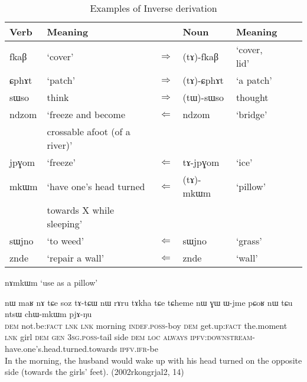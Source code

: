 \documentclass[oldfontcommands,oneside,a4paper,11pt]{article}
\newcommand{\ipa}[1]{{\phon \mbox{#1}}} %
\begin{document}
\begin{table}[H]
\caption{Examples of Inverse derivation} \centering \label{tab:rueckbildung}
\begin{tabular}{lllllll}
\toprule
Verb & Meaning &&Noun & Meaning\\
\midrule
\ipa{fkaβ} & `cover' & $\Rightarrow$ &\ipa{(tɤ)-fkaβ} &`cover, lid' \\
\ipa{ɕphɤt} & `patch'& $\Rightarrow$ &\ipa{(tɤ)-ɕphɤt} & `a patch'  \\
\ipa{sɯso} & think &  $\Rightarrow$ & \ipa{(tɯ)-sɯso} & thought \\
\midrule
\ipa{ndzom} & `freeze and become   &$\Leftarrow$ &\ipa{ndzom} &`bridge' \\
&crossable afoot (of a river)'&&&\\
\ipa{jpɣom} & `freeze' & $\Leftarrow$ &\ipa{tɤ-jpɣom}& `ice' \\
\ipa{mkɯm} & `have one's head turned& $\Leftarrow$ &\ipa{(tɤ)-mkɯm}& `pillow' \\
&   towards X while sleeping' &&&\\
\ipa{sɯjno} & `to weed'   &$\Leftarrow$ &\ipa{sɯjno} &`grass' \\
\ipa{znde} & `repair a wall'  &$\Leftarrow$ &\ipa{znde} &`wall' \\
\bottomrule
\end{tabular}
\end{table}

\ipa{nɤmkɯm} `use as a pillow'


\begin{exe}
\ex
\gll 
\ipa{nɯ}  	\ipa{maʁ}  	\ipa{nɤ}  \ipa{tɕe}   \ipa{soz}  	\ipa{tɤ-tɕɯ}  	\ipa{nɯ}  	\ipa{rɤru}  	\ipa{tɤkha}  	\ipa{tɕe}   	\ipa{tɕheme}  	\ipa{nɯ}  	\ipa{ɣɯ}  	\ipa{ɯ-jme}  	\ipa{pɕoʁ}  	\ipa{nɯ}  	\ipa{tɕu}  	\ipa{ntsɯ}  	\ipa{chɯ-mkɯm}  	\ipa{pjɤ-ŋu}   \\
\textsc{dem} not.be:\textsc{fact} \textsc{lnk} \textsc{lnk} morning \textsc{indef.poss}-boy \textsc{dem}  get.up:\textsc{fact} the.moment \textsc{lnk} girl \textsc{dem} \textsc{gen} \textsc{3sg.poss}-tail side \textsc{dem} \textsc{loc} \textsc{always} \textsc{ipfv:downstream}-have.one's.head.turned.towards \textsc{ipfv.ifr}-be \\
\glt In the morning, the husband would wake up with his head turned on the opposite side (towards the girls' feet). (2002rkongrjal2, 14)
\end{exe}
\end{document}
